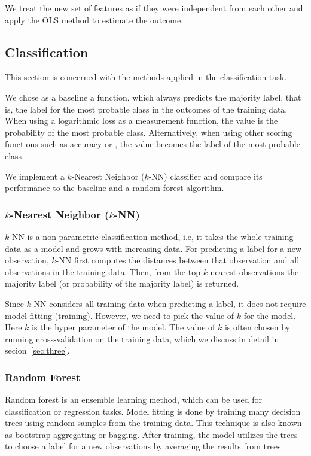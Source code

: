 We treat the new set of features as if they were independent from each other
and apply the OLS method to estimate the outcome.

\subsection{Classification}

This section is concerned with the methods applied in the classification task.

We chose as a baseline a function, which always predicts the majority label,
that is, the label for the most probable class in the outcomes of the training
data.  When using a logarithmic loss as a measurement function, the value is the
probability of the most probable class.  Alternatively, when using other scoring
functions such as accuracy or \fmeasure, the value becomes the label of the most
probable class.

We implement a $k$-Nearest Neighbor ($k$-NN) classifier and compare its
performance to the baseline and a random forest algorithm.

\subsubsection{$k$-Nearest Neighbor ($k$-NN)}

$k$-NN is a non-parametric classification method, i.e, it takes the whole
training data as a model and grows with increasing data.  For predicting a label
for a new observation, $k$-NN first computes the distances between that
observation and all observations in the training data.  Then, from the top-$k$
nearest observations the majority label (or probability of the majority label)
is returned.

Since $k$-NN considers all training data when predicting a label, it does not
require model fitting (training).  However, we need to pick the value of $k$ for
the model.  Here $k$ is the hyper parameter of the model.  The value of $k$ is
often chosen by running cross-validation on the training data, which we discuss
in detail in secion~\ref{sec:three}.

\subsubsection{Random Forest}

Random forest is an ensemble learning method, which can be used for
classification or regression tasks.  Model fitting is done by training many
decision trees using random samples from the training data.  This technique is
also known as bootstrap aggregating or bagging.  After training, the model
utilizes the trees to choose a label for a new observations by averaging the
results from trees.

